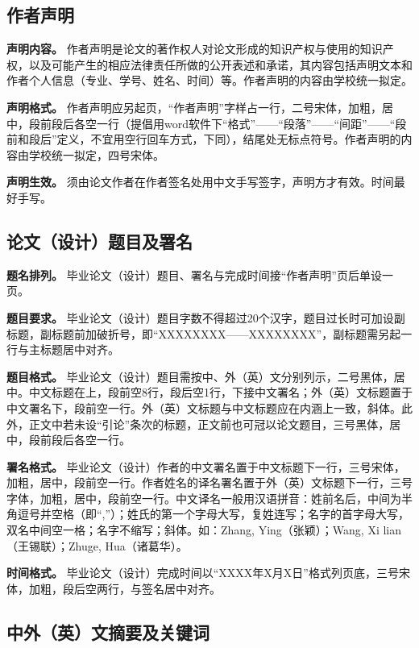 \documentclass[singlesided]{Style/ucasthesis}%
\begin{document}
\hypertarget{section-12}{%
\subsection{作者声明}\label{section-12}}

\textbf{声明内容。} 作者声明是论文的著作权人对论文形成的知识产权与使用的知识产权，以及可能产生的相应法律责任所做的公开表述和承诺，其内容包括声明文本和作者个人信息（专业、学号、姓名、时间）等。作者声明的内容由学校统一拟定。

\textbf{声明格式。} 作者声明应另起页，``作者声明''字样占一行，二号宋体，加粗，居中，段前段后各空一行（提倡用word软件下``格式''------``段落''------``间距''------``段前和段后''定义，不宜用空行回车方式，下同），结尾处无标点符号。作者声明的内容由学校统一拟定，四号宋体。

\textbf{声明生效。} 须由论文作者在作者签名处用中文手写签字，声明方才有效。时间最好手写。

\hypertarget{section-13}{%
\subsection{论文（设计）题目及署名}\label{section-13}}

\textbf{题名排列。} 毕业论文（设计）题目、署名与完成时间接``作者声明''页后单设一页。

\textbf{题目要求。} 毕业论文（设计）题目字数不得超过20个汉字，题目过长时可加设副标题，副标题前加破折号，即``XXXXXXXX------XXXXXXXX''，副标题需另起一行与主标题居中对齐。

\textbf{题目格式。} 毕业论文（设计）题目需按中、外（英）文分别列示，二号黑体，居中。中文标题在上，段前空8行，段后空1行，下接中文署名；外（英）文标题置于中文署名下，段前空一行。外（英）文标题与中文标题应在内涵上一致，斜体。此外，正文中若未设``引论''条次的标题，正文前也可冠以论文题目，三号黑体，居中，段前段后各空一行。

\textbf{署名格式。} 毕业论文（设计）作者的中文署名置于中文标题下一行，三号宋体，加粗，居中，段前空一行。作者姓名的译名署名置于外（英）文标题下一行，三号字体，加粗，居中，段前空一行。中文译名一般用汉语拼音：姓前名后，中间为半角逗号并空格（即``,''）；姓氏的第一个字母大写，复姓连写；名字的首字母大写，双名中间空一格；名字不缩写；斜体。如：Zhang, Ying（张颖）；Wang, Xi lian（王锡联）；Zhuge, Hua（诸葛华）。

\textbf{时间格式。} 毕业论文（设计）完成时间以``XXXX年X月X日''格式列页底，三号宋体，加粗，段后空两行，与签名居中对齐。

\hypertarget{section-14}{%
\subsection{中外（英）文摘要及关键词}\label{section-14}}
\end{document}
